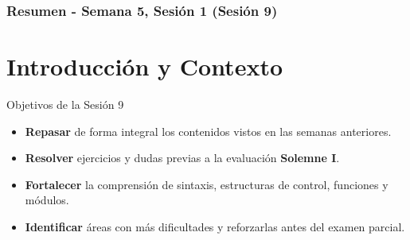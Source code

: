 \documentclass[10pt]{beamer}
\begin{document}
\myfront{}

\begin{frame}
  \titlepage
\end{frame}

\begin{frame}
  \frametitle{Resumen - Semana 5, Sesión 1 (Sesión 9)}
  \tableofcontents
\end{frame}


\section{Introducción y Contexto}

\begin{frame}{Objetivos de la Sesión 9}
  \begin{itemize}
    \item \textbf{Repasar} de forma integral los contenidos vistos en las semanas anteriores.
    \item \textbf{Resolver} ejercicios y dudas previas a la evaluación \textbf{Solemne I}.
    \item \textbf{Fortalecer} la comprensión de sintaxis, estructuras de control, funciones y módulos.
    \item \textbf{Identificar} áreas con más dificultades y reforzarlas antes del examen parcial.
  \end{itemize}
\end{frame}
\end{document}
